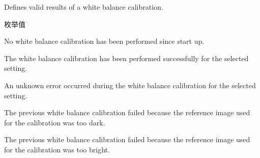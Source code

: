 Defines valid results of a white balance calibration. 

\begin{Desc}
\item[枚举值]\par
\begin{description}
\item[{\em 
\hypertarget{group___common_interface_ggac25746f6cbcf893d3ca308d3e978f39dacf97bbf381766820438e2ad5d47812b9}{bwbr\+Unknown}\label{group___common_interface_ggac25746f6cbcf893d3ca308d3e978f39dacf97bbf381766820438e2ad5d47812b9}
}]No white balance calibration has been performed since start up. \item[{\em 
\hypertarget{group___common_interface_ggac25746f6cbcf893d3ca308d3e978f39daf8bfe1f907251dcabe7383de7f203abc}{bwbr\+O\+K}\label{group___common_interface_ggac25746f6cbcf893d3ca308d3e978f39daf8bfe1f907251dcabe7383de7f203abc}
}]The white balance calibration has been performed successfully for the selected setting. \item[{\em 
\hypertarget{group___common_interface_ggac25746f6cbcf893d3ca308d3e978f39dabf3dac6ebff13bcc06d3956393786cb6}{bwbr\+Error\+Unknown}\label{group___common_interface_ggac25746f6cbcf893d3ca308d3e978f39dabf3dac6ebff13bcc06d3956393786cb6}
}]An unknown error occurred during the white balance calibration for the selected setting. \item[{\em 
\hypertarget{group___common_interface_ggac25746f6cbcf893d3ca308d3e978f39dad9346833bbcab449964e8c0c92132175}{bwbr\+Error\+Too\+Dark}\label{group___common_interface_ggac25746f6cbcf893d3ca308d3e978f39dad9346833bbcab449964e8c0c92132175}
}]The previous white balance calibration failed because the reference image used for the calibration was too dark. \item[{\em 
\hypertarget{group___common_interface_ggac25746f6cbcf893d3ca308d3e978f39da1440b9f3f541551da4d0d8fe022587f4}{bwbr\+Error\+Too\+Bright}\label{group___common_interface_ggac25746f6cbcf893d3ca308d3e978f39da1440b9f3f541551da4d0d8fe022587f4}
}]The previous white balance calibration failed because the reference image used for the calibration was too bright. \end{description}
\end{Desc}
